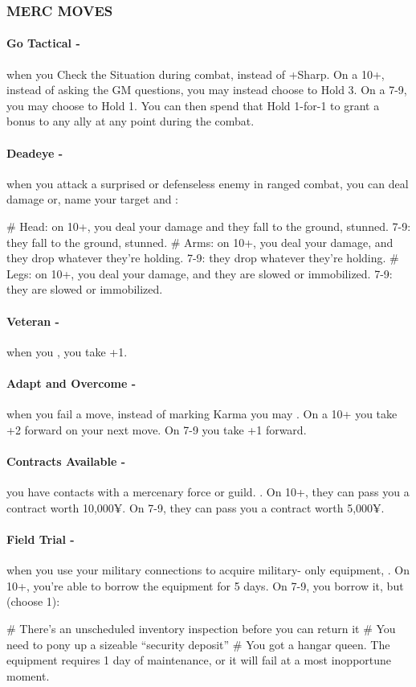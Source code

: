 \subsubsection{MERC MOVES}
\paragraph{Go Tactical -} when you Check the Situation during combat,  instead of +Sharp. On a 10+, instead of asking the GM questions, you may instead choose to Hold 3. On a 7-9, you may choose to Hold 1. You can then spend that Hold 1-for-1 to grant a bonus to any ally at any point during the combat.

\paragraph{Deadeye -} when you attack a surprised or defenseless enemy in ranged combat, you can deal damage or, name your target and :
    \begin{easylist}
        # Head: on 10+, you deal your damage and they fall to the ground, stunned. 7-9: they fall to the ground, stunned.
        # Arms: on 10+, you deal your damage, and they drop whatever they’re holding. 7-9: they drop whatever they’re holding.
        # Legs: on 10+, you deal your damage, and they are slowed or immobilized. 7-9: they are slowed or immobilized.
    \end{easylist}

\paragraph{Veteran -} when you , you take +1.

\paragraph{Adapt and Overcome -} when you fail a move, instead of marking Karma you may . On a 10+ you take +2 forward on your next move. On 7-9 you take +1 forward.

\paragraph{Contracts Available -} you have contacts with a mercenary force or guild. . On 10+, they can pass you a contract worth 10,000¥. On 7-9, they can pass you a contract worth 5,000¥.

\paragraph{Field Trial -} when you use your military connections to acquire military- only equipment, . On 10+, you’re able to borrow the equipment for 5 days. On 7-9, you borrow it, but (choose 1):
    \begin{easylist}
        # There’s an unscheduled inventory inspection before you can return it
        # You need to pony up a sizeable ``security deposit''
        # You got a hangar queen. The equipment requires 1 day of maintenance, or it will fail at a most inopportune moment.
    \end{easylist}

